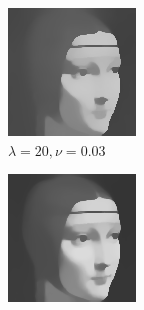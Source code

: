 \documentclass[abstracton]{scrreprt}
\begin{document}
\begin{figure}[!ht]
\begin{subfigure}[b]{0.24\textwidth}
                    \includegraphics[width=\textwidth]{img/approximation/2ladama02.png}
                    \caption{$\lambda = 20, \nu = 0.03$}
                \end{subfigure}
                \begin{subfigure}[b]{0.24\textwidth}
                    \includegraphics[width=\textwidth]{img/approximation/02ladama002.png}

\end{subfigure}
\end{figure}
\end{document}
